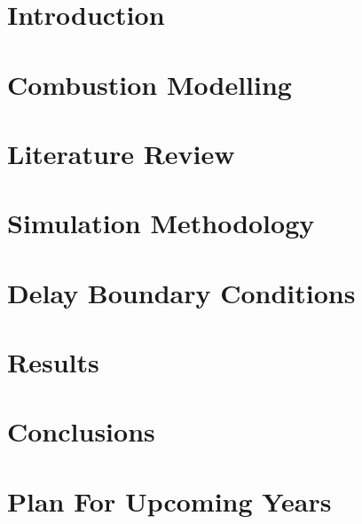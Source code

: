 \documentclass[lmr,second,hyperref,rgb,hyperref,dvipsnames]{uom_thesis_casson}
\title{\xmp@Title}
\author{\xmp@Author}
\begin{document}
\maketitle



\uomtoc

\uomstartmainbody %

\chapter{Introduction} \label{ch:intro}


\chapter{Combustion Modelling} \label{ch:combust-model}


\chapter{Literature Review} \label{ch:lit-review}


\chapter{Simulation Methodology} \label{ch:dns-methods}


% 

\chapter{Delay Boundary Conditions} \label{ch:delay-bcs}


\chapter{Results} \label{ch:results}


\chapter{Conclusions} \label{ch:conc}


\chapter{Plan For Upcoming Years} \label{ch:plan}



\printbibliography[title={References},heading=bibintoc]
\end{document}
